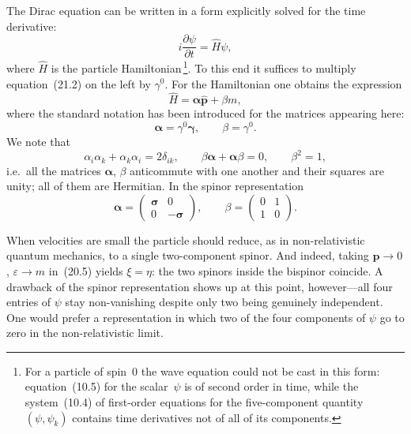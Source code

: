 The Dirac equation can be written in a form explicitly solved for the time derivative:
\begin{equation}
i\frac{\partial\psi}{\partial t} = \widehat H\psi,
\tag{21.12}
\end{equation}
where $\widehat H$ is the particle Hamiltonian\,\footnote{For a particle of spin~0 the wave equation could not be cast in this form: equation~(10.5) for the scalar~$\psi$ is of second order in time, while the system~(10.4) of first-order equations for the five-component quantity $(\psi, \psi_k)$ contains time derivatives not of all of its components.}. To this end it suffices to multiply equation~(21.2) on the left by $\gamma^0$. For the Hamiltonian one obtains the expression
\begin{equation}
\widehat H = \boldsymbol{\alpha}\widehat{\mathbf{p}} + \beta m,
\tag{21.13}
\end{equation}
where the standard notation has been introduced for the matrices appearing here:
\begin{equation}
\boldsymbol{\alpha} = \gamma^0\boldsymbol{\gamma},\qquad \beta = \gamma^0.
\tag{21.14}
\end{equation}
We note that
\begin{equation}
\alpha_i\alpha_k + \alpha_k\alpha_i = 2\delta_{ik},\qquad \beta\boldsymbol{\alpha} + \boldsymbol{\alpha}\beta = 0,\qquad \beta^2 = 1,
\tag{21.15}
\end{equation}
i.e.\ all the matrices $\boldsymbol{\alpha}$, $\beta$ anticommute with one another and their squares are unity; all of them are Hermitian. In the spinor representation
\begin{equation}
\boldsymbol{\alpha} = \begin{pmatrix} \boldsymbol{\sigma} & 0\\ 0 & -\boldsymbol{\sigma} \end{pmatrix},\qquad \beta = \begin{pmatrix} 0 & 1\\ 1 & 0 \end{pmatrix}.
\tag{21.16}
\end{equation}

When velocities are small the particle should reduce, as in non-relativistic quantum mechanics, to a single two-component spinor. And indeed, taking $\mathbf{p} \to 0$, $\varepsilon \to m$ in~(20.5) yields $\xi = \eta$: the two spinors inside the bispinor coincide. A drawback of the spinor representation shows up at this point, however---all four entries of $\psi$ stay non-vanishing despite only two being genuinely independent. One would prefer a representation in which two of the four components of $\psi$ go to zero in the non-relativistic limit.

